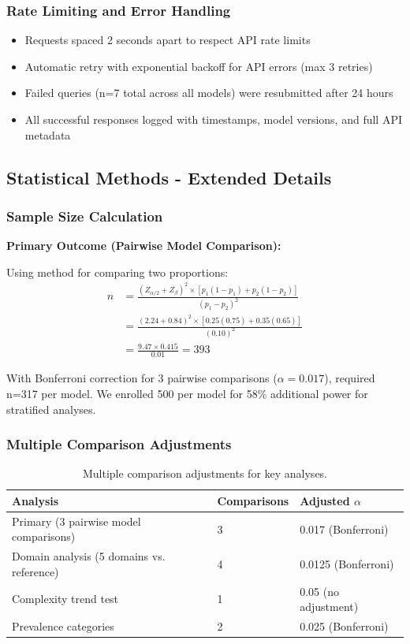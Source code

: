 \documentclass[11pt,a4paper]{article}
\begin{document}
\subsubsection{Rate Limiting and Error Handling}

\begin{itemize}
    \item Requests spaced 2 seconds apart to respect API rate limits
    \item Automatic retry with exponential backoff for API errors (max 3 retries)
    \item Failed queries (n=7 total across all models) were resubmitted after 24 hours
    \item All successful responses logged with timestamps, model versions, and full API metadata
\end{itemize}

\subsection{Statistical Methods - Extended Details}

\subsubsection{Sample Size Calculation}

\textbf{Primary Outcome (Pairwise Model Comparison):}

Using method for comparing two proportions:
\begin{align*}
n &= \frac{(Z_{\alpha/2} + Z_\beta)^2 \times [p_1(1-p_1) + p_2(1-p_2)]}{(p_1 - p_2)^2} \\
&= \frac{(2.24 + 0.84)^2 \times [0.25(0.75) + 0.35(0.65)]}{(0.10)^2} \\
&= \frac{9.47 \times 0.415}{0.01} = 393
\end{align*}

With Bonferroni correction for 3 pairwise comparisons ($\alpha = 0.017$), required n=317 per model. We enrolled 500 per model for 58\% additional power for stratified analyses.

\subsubsection{Multiple Comparison Adjustments}

\begin{table}[H]
\centering
\begin{tabular}{lll}
\toprule
\textbf{Analysis} & \textbf{Comparisons} & \textbf{Adjusted $\alpha$} \\
\midrule
Primary (3 pairwise model comparisons) & 3 & 0.017 (Bonferroni) \\
Domain analysis (5 domains vs. reference) & 4 & 0.0125 (Bonferroni) \\
Complexity trend test & 1 & 0.05 (no adjustment) \\
Prevalence categories & 2 & 0.025 (Bonferroni) \\
\bottomrule
\end{tabular}
\caption{Multiple comparison adjustments for key analyses.}
\end{table}
\end{document}
